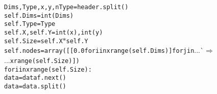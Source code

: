 {{\begin{tabbing}
{\texttt{\hspace{48pt}Dims,Type,x,y,nType=\hspace{6pt}header.split()}}\\
{\texttt{\hspace{48pt}self.Dims\hspace{6pt}=\hspace{6pt}int(Dims)}}\\
{\texttt{\hspace{48pt}self.Type\hspace{6pt}=\hspace{6pt}Type}}\\
{\texttt{\hspace{48pt}self.X,\hspace{6pt}self.Y\hspace{6pt}=\hspace{6pt}int(x),int(y)}}\\
{\texttt{\hspace{48pt}self.Size\hspace{6pt}=\hspace{6pt}self.X$\ast$self.Y}}\\
{\texttt{\hspace{48pt}self.nodes\hspace{6pt}=\hspace{6pt}array({[}{[}0.0\hspace{6pt}for\hspace{6pt}i\hspace{6pt}in\hspace{6pt}xrange(self.Dims){]}\hspace{6pt}for\hspace{6pt}j\hspace{6pt}in\hspace{6pt}}}{}...\`$\Rightarrow$\\
...{}{\texttt{xrange(self.Size){]})}}\\
{\texttt{\hspace{48pt}for\hspace{6pt}i\hspace{6pt}in\hspace{6pt}xrange(self.Size):}}\\
{\texttt{\hspace{72pt}data\hspace{6pt}=\hspace{6pt}dataf.next()}}\\
{\texttt{\hspace{72pt}data\hspace{6pt}=\hspace{6pt}data.split()}}\\

\end{tabbing}}}
